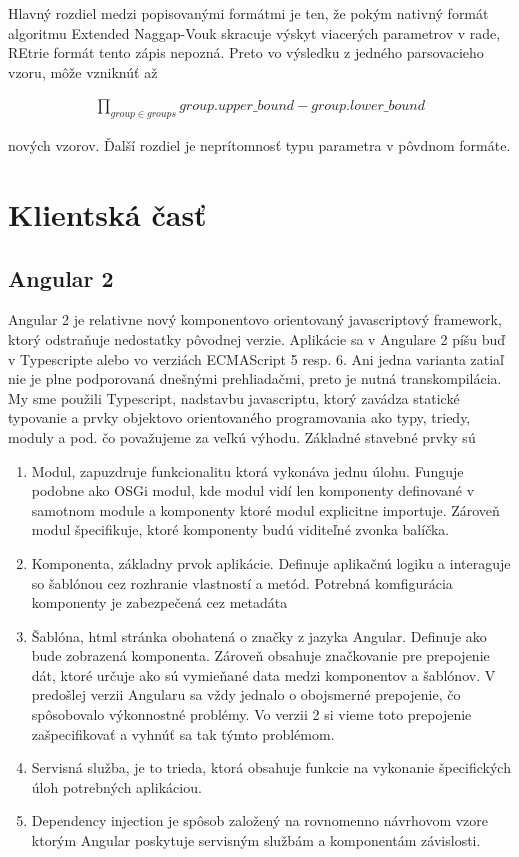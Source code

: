 Hlavný rozdiel medzi popisovanými formátmi je ten, že pokým nativný formát algoritmu Extended Naggap-Vouk skracuje výskyt viacerých parametrov v rade, REtrie formát tento zápis nepozná. Preto vo výsledku z jedného parsovacieho vzoru, môže vzniknúť až 

\begin{align*}
\prod_{group \in groups} group.upper\_bound - group.lower\_bound
\end{align*}

nových vzorov. Ďalší rozdiel je neprítomnosť typu parametra v pôvdnom formáte.


\section{Klientská časť}


\subsection{Angular 2}
Angular 2 je relativne nový komponentovo orientovaný javascriptový framework, ktorý odstraňuje nedostatky pôvodnej verzie. Aplikácie sa v Angulare 2 píšu buď v Typescripte alebo vo verziách ECMAScript 5 resp. 6. Ani jedna varianta zatiaľ nie je plne podporovaná dnešnými prehliadačmi, preto je nutná transkompilácia. My sme použili Typescript, nadstavbu javascriptu, ktorý zavádza statické typovanie a prvky objektovo orientovaného programovania ako typy, triedy, moduly a pod. čo považujeme za veľkú výhodu. Základné stavebné prvky sú

\begin{enumerate}
 \item Modul, zapuzdruje funkcionalitu ktorá vykonáva jednu úlohu. Funguje podobne ako OSGi modul, kde modul vidí len komponenty definované v samotnom module a komponenty ktoré modul explicitne importuje. Zároveň modul špecifikuje, ktoré komponenty budú viditeľné zvonka balíčka.
 \item Komponenta, základny prvok aplikácie. Definuje aplikačnú logiku a interaguje so šablónou cez rozhranie vlastností a metód. Potrebná komfigurácia komponenty je zabezpečená cez metadáta
 \item Šablóna, html stránka obohatená o značky z jazyka Angular. Definuje ako bude zobrazená komponenta. Zároveň obsahuje značkovanie pre prepojenie dát, ktoré určuje ako sú vymieňané data medzi komponentov a šablónov. V predošlej verzii Angularu sa vždy jednalo o obojsmerné prepojenie, čo spôsobovalo výkonnostné problémy. Vo verzii 2 si vieme toto prepojenie zašpecifikovať a vyhnúť sa tak týmto problémom.
 \item Servisná služba, je to trieda, ktorá obsahuje funkcie na vykonanie špecifických úloh potrebných aplikáciou. 
 \item Dependency injection je spôsob založený na rovnomenno návrhovom vzore ktorým Angular poskytuje servisným službám a komponentám závislosti.
\end{enumerate}

